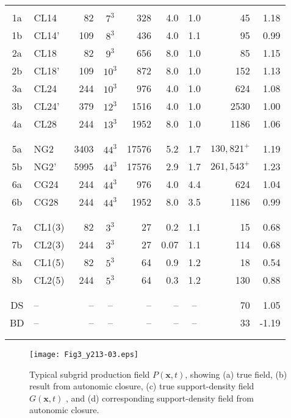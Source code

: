 \begin{table}[tb]
\begin{tabular}{clrcrrcrr}
	\hline \\
		1a 	&	CL14	&	82	&	$7^3$	&	328		&	4.0	&	1.0	&	45		&	1.18 \\
		1b	&	CL14'	&	109	&	$8^3$	&	436		&	4.0	&	1.1	&	95		&	0.99 \\
		2a 	&	CL18	&	82	&	$9^3$	&	656		&	8.0	&	1.0	&	85		&	1.15 \\
		2b	&	CL18'	&	109	&	$10^3$	&	872		&	8.0	&	1.0	&	152		&	1.13 \\
		3a	&	CL24	&	244	&	$10^3$	&	976		&	4.0	&	1.0	&	624		&	1.08 \\
		3b	&	CL24'	&	379	&	$12^3$	&	1516 	&	4.0	&	1.0	&	2530	&	1.00 \\
		4a	&	CL28	&	244	&	$13^3$	&	1952	&	8.0	&	1.0	&	1186	&	1.06 \\ \\
	\hline \\
		5a	&	NG2 	&  3403	&	$44^3$	&	17576	&	5.2	&	1.7	& $130,821^+$ &	1.19 \\
		5b	&	NG2'	&  5995	&	$44^3$	&	17576	&	2.9	&	1.7	& $261,543^+$ &	1.23 \\
		6a	&	CG24	&	244	&	$44^3$	&	976		&	4.0	&	4.4	&	624		&	1.04 \\
		6b	&	CG28	&	244	&	$44^3$	&	1952	&	8.0	&	3.5	&	1186	&	0.99 \\ \\
	\hline \\
		7a 	&	CL1(3)	&	82	&	$3^3$	&	27		&	0.2	&	1.1	&	15		&	0.68 \\
		7b	&	CL2(3)	&	244	&	$3^3$	&	27		&  0.07	&	1.1	&	114		&	0.68 \\
		8a	&	CL1(5)	&	82	&	$5^3$	&	64		&	0.9	&	1.2	&	18		&	0.54 \\
		8b	&	CL2(5)	&	244	&	$5^3$	&	64		&	0.3	&	1.2	&	130		&	0.88 \\ \\
	\hline \\
		DS 	&	--		&	--	&	--		&	--		&	--	&	--	&	70		&	1.05 \\
		BD 	&	--		&	--	&	--		&	--		&	--	&	--	&	33		&  -1.19 \\ \\
	\hline	\\
	\end{tabular}	
\end{table}

%
%         

%
\begin{figure}
	\begin{center}
	\texttt{[image: Fig3\_y213-03.eps]}
	\caption{ Typical subgrid production field $P(\mathbf{x},t)$, showing (a) true field, (b) result from autonomic closure, (c) true support-density field $G(\mathbf{x},t)$ , and (d) corresponding support-density field from autonomic closure. }
	\label{F:3}
	\end{center}
\end{figure}
%
%

